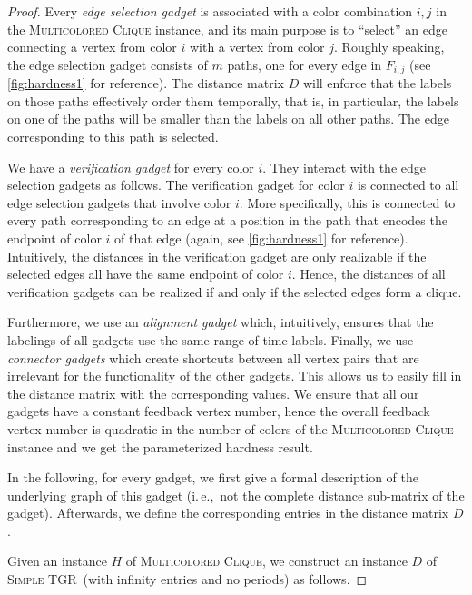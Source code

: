 \documentclass[a4paper,UKenglish,cleveref, autoref, thm-restate]{lipics-v2021}
\newcommand{\ie}{i.\,e.,\ }
\newcommand{\deltaExact}{\textsc{Simple TGR}}
\begin{document}
\begin{proof}
Every \emph{edge selection gadget} is associated with a color combination $i,j$ in the \textsc{Multicolored Clique} instance, and its main purpose is to ``select'' an edge connecting a vertex from color $i$ with a vertex from color $j$.
Roughly speaking, the edge selection gadget consists of $m$ paths, one for every edge in $F_{i,j}$ (see \cref{fig:hardness1} for reference). The distance matrix $D$ will enforce that the labels on those paths effectively order them temporally, that is, in particular, the labels on one of the paths will be smaller than the labels on all other paths. The edge corresponding to this path is selected.


 We have a \emph{verification gadget} for every color $i$. They interact with the edge selection gadgets as follows.
 The verification gadget for color $i$ is connected to all edge selection gadgets that involve color $i$. More specifically, this is connected to every path corresponding to an edge at a position in the path that encodes the endpoint of color $i$ of that edge (again, see \cref{fig:hardness1} for reference). Intuitively, the distances in the verification gadget are only realizable if the selected edges all have the same endpoint of color $i$.
Hence, the distances of all verification gadgets can be realized if and only if the selected edges form a clique. 

Furthermore, we use an \emph{alignment gadget} which, intuitively, ensures that the labelings of all gadgets use the same range of time labels. Finally, we use \emph{connector gadgets} which create shortcuts between all vertex pairs that are irrelevant for the functionality of the other gadgets. This allows us to easily fill in the distance matrix with the corresponding values.
We ensure that all our gadgets have a constant feedback vertex number, hence the overall feedback vertex number is quadratic in the number of colors of the \textsc{Multicolored Clique} instance and we get the parameterized hardness result.

In the following, for every gadget, we first give a formal description of the underlying graph of this gadget (\ie not the complete distance sub-matrix of the gadget). Afterwards, we define the corresponding entries in the distance matrix $D$.

    Given an instance $H$ of \textsc{Multicolored Clique}, we construct an instance $D$ of \deltaExact\ (with infinity entries and no periods) as follows. 
    

\end{proof}
\end{document}
